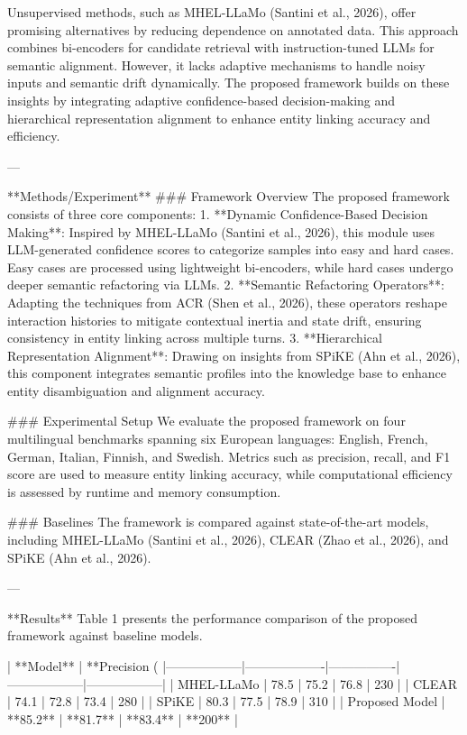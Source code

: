 Unsupervised methods, such as MHEL-LLaMo (Santini et al., 2026), offer promising alternatives by reducing dependence on annotated data. This approach combines bi-encoders for candidate retrieval with instruction-tuned LLMs for semantic alignment. However, it lacks adaptive mechanisms to handle noisy inputs and semantic drift dynamically. The proposed framework builds on these insights by integrating adaptive confidence-based decision-making and hierarchical representation alignment to enhance entity linking accuracy and efficiency.

---

**Methods/Experiment**  
### Framework Overview  
The proposed framework consists of three core components:  
1. **Dynamic Confidence-Based Decision Making**: Inspired by MHEL-LLaMo (Santini et al., 2026), this module uses LLM-generated confidence scores to categorize samples into easy and hard cases. Easy cases are processed using lightweight bi-encoders, while hard cases undergo deeper semantic refactoring via LLMs.  
2. **Semantic Refactoring Operators**: Adapting the techniques from ACR (Shen et al., 2026), these operators reshape interaction histories to mitigate contextual inertia and state drift, ensuring consistency in entity linking across multiple turns.  
3. **Hierarchical Representation Alignment**: Drawing on insights from SPiKE (Ahn et al., 2026), this component integrates semantic profiles into the knowledge base to enhance entity disambiguation and alignment accuracy.

### Experimental Setup  
We evaluate the proposed framework on four multilingual benchmarks spanning six European languages: English, French, German, Italian, Finnish, and Swedish. Metrics such as precision, recall, and F1 score are used to measure entity linking accuracy, while computational efficiency is assessed by runtime and memory consumption.

### Baselines  
The framework is compared against state-of-the-art models, including MHEL-LLaMo (Santini et al., 2026), CLEAR (Zhao et al., 2026), and SPiKE (Ahn et al., 2026).

---

**Results**  
Table 1 presents the performance comparison of the proposed framework against baseline models.  

| **Model**       | **Precision (%
|------------------|-------------------|----------------|------------------|------------------|  
| MHEL-LLaMo      | 78.5              | 75.2           | 76.8             | 230              |  
| CLEAR           | 74.1              | 72.8           | 73.4             | 280              |  
| SPiKE           | 80.3              | 77.5           | 78.9             | 310              |  
| Proposed Model  | **85.2**          | **81.7**       | **83.4**         | **200**          |  

